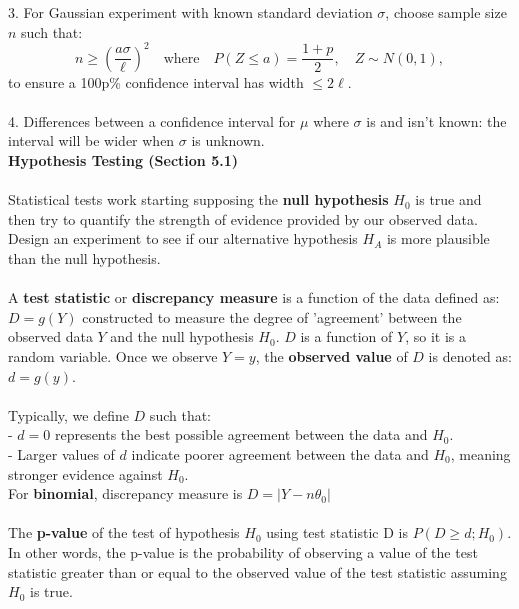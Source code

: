 \documentclass[a4paper,12pt]{article}
\begin{document}
3. For Gaussian experiment with known standard deviation \(\sigma\), choose sample size \(n\) such that:
\[
n \geq \left( \frac{a \sigma}{\ell} \right)^2 \quad \text{where} \quad P(Z \leq a) = \frac{1 + p}{2}, \quad Z \sim N(0, 1),
\]
to ensure a 100p\% confidence interval has width \(\leq 2\ell\).
\\
\\4. Differences between a confidence interval for \(\mu\) where \(\sigma\) is and isn't known: the interval will be wider when \(\sigma\) is unknown.
\\

\textbf{Hypothesis Testing (Section 5.1)}
\\
\\Statistical tests work starting supposing the \textbf{null hypothesis} $H_0$ is true and then try to quantify the
strength of evidence provided by our observed data. Design an experiment to see if our alternative hypothesis $H_A$ is more plausible than the null hypothesis.
\\
\\A \textbf{test statistic} or \textbf{discrepancy measure} is a function of the data defined as: $D = g(Y)$
constructed to measure the degree of 'agreement' between the observed data \(Y\) and the null hypothesis \(H_0\). \(D\) is a function of \(Y\), so it is a random variable. Once we observe \(Y = y\), the \textbf{observed value }of \(D\) is denoted as:
$d = g(y)$.
\\
\\Typically, we define \(D\) such that:
\\- \(d = 0\) represents the best possible agreement between the data and \(H_0\).
\\- Larger values of \(d\) indicate poorer agreement between the data and \(H_0\), meaning stronger evidence against \(H_0\).
\\ For \textbf{binomial}, discrepancy measure is  $D = |Y - n\theta_0|$
\\
\\The \textbf{p-value} of the test of hypothesis $H_0$ using test
statistic D is $P(D \geq d; H_0)$.
In other words, the p-value is the probability of observing a value of the test statistic greater than or equal to the observed value of the test statistic assuming $H_0$ is true.
\end{document}
